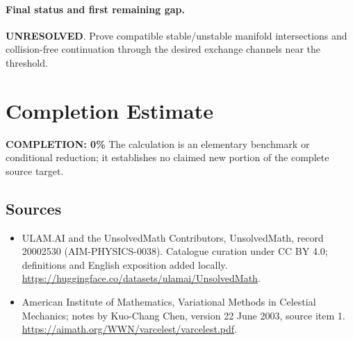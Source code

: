 \documentclass[11pt]{article}
\begin{document}
\paragraph{Final status and first remaining gap.}
\textbf{UNRESOLVED}. Prove compatible stable/unstable manifold intersections and collision-free continuation through the desired exchange channels near the threshold.

\section{Completion Estimate}
\noindent\textbf{COMPLETION: 0\%}
The calculation is an elementary benchmark or conditional reduction; it establishes no claimed new portion of the complete source target.

\subsection{Sources}
\begin{itemize}
\item[\hypertarget{source:20002530:1}{S1}] ULAM.AI and the UnsolvedMath Contributors, UnsolvedMath, record 20002530 (AIM-PHYSICS-0038). Catalogue curation under CC BY 4.0; definitions and English exposition added locally.
\url{https://huggingface.co/datasets/ulamai/UnsolvedMath}.
\item[\hypertarget{source:20002530:2}{S2}] American Institute of Mathematics, Variational Methods in Celestial Mechanics; notes by Kuo-Chang Chen, version 22 June 2003, source item 1.
\url{https://aimath.org/WWN/varcelest/varcelest.pdf}.
\end{itemize}
\label{end:20002530}
\end{document}
